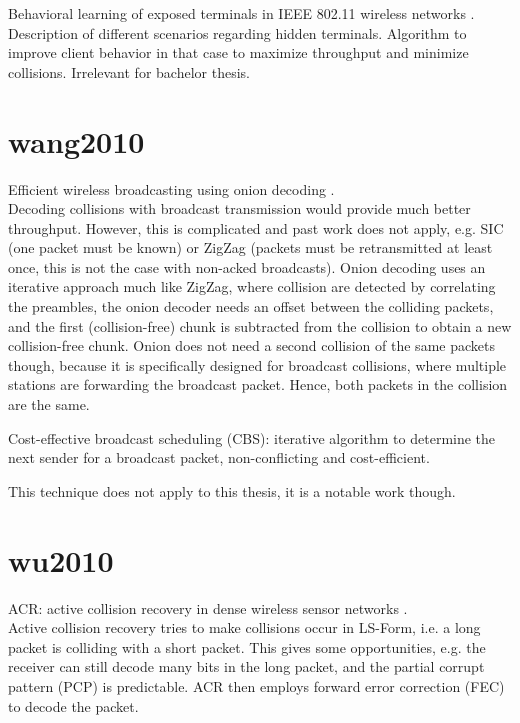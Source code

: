 Behavioral learning of exposed terminals in IEEE 802.11 wireless networks \cite{cao2009}.\\

Description of different scenarios regarding hidden terminals. Algorithm to improve client behavior in that case to maximize throughput and minimize collisions. Irrelevant for bachelor thesis.



\section*{wang2010}

Efficient wireless broadcasting using onion decoding \cite{wang2010}.\\

Decoding collisions with broadcast transmission would provide much better throughput. However, this is complicated and past work does not apply, e.g. SIC (one packet must be known) or ZigZag \cite{gollakota2008} (packets must be retransmitted at least once, this is not the case with non-acked broadcasts). Onion decoding uses an iterative approach much like ZigZag, where collision are detected by correlating the preambles, the onion decoder needs an offset between the colliding packets, and the first (collision-free) chunk is subtracted from the collision to obtain a new collision-free chunk. Onion does not need a second collision of the same packets though, because it is specifically designed for broadcast collisions, where multiple stations are forwarding the broadcast packet. Hence, both packets in the collision are the same.

Cost-effective broadcast scheduling (CBS): iterative algorithm to determine the next sender for a broadcast packet, non-conflicting and cost-efficient.

This technique does not apply to this thesis, it is a notable work though.



\section*{wu2010}

ACR: active collision recovery in dense wireless sensor networks \cite{wu2010}.\\

Active collision recovery tries to make collisions occur in LS-Form, i.e. a long packet is colliding with a short packet. This gives some opportunities, e.g. the receiver can still decode many bits in the long packet, and the partial corrupt pattern (PCP) is predictable. ACR then employs forward error correction (FEC) to decode the packet.

